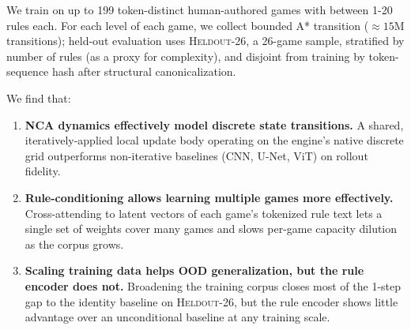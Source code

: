 We train on up to 199 token-distinct human-authored games with between 1-20 rules each.
For each level of each game, we collect bounded A* transition ($\approx 15$M transitions); held-out evaluation uses \textsc{Heldout-26}, a 26-game sample, stratified by number of rules (as a proxy for complexity), and disjoint from training by token-sequence hash after structural canonicalization.

We find that:
\begin{enumerate}
  \item \textbf{NCA dynamics effectively model discrete state transitions.}
        A shared, iteratively-applied local update body operating on the engine's native discrete grid outperforms non-iterative baselines (CNN, U-Net, ViT) on rollout fidelity.
  \item \textbf{Rule-conditioning allows learning multiple games more effectively.}
        Cross-attending to latent vectors of each game's tokenized rule text lets a single set of weights cover many games and slows per-game capacity dilution as the corpus grows.
  \item \textbf{Scaling training data helps OOD generalization, but the rule encoder does not.}
        Broadening the training corpus closes most of the 1-step gap to the identity baseline on \textsc{Heldout-26}, but the rule encoder shows little advantage over an unconditional baseline at any training scale.
\end{enumerate}
